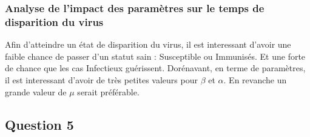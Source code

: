 \documentclass[a4paper, 11pt, oneside]{article}
\begin{document}
\subsubsection{Analyse de l'impact des paramètres sur le temps de disparition du virus}
Afin d'atteindre un état de disparition du virus, il est interessant d'avoir une faible chance de passer d'un 
statut sain : Susceptible ou Immunisés. Et une forte de chance que les cas Infectieux guérissent. 
Dorénavant, en terme de paramètres, il est interessant d'avoir de très petites valeurs pour 
$\beta$ et $\alpha$. En revanche un grande valeur de $\mu$ serait préférable.

\subsection{Question 5}
\end{document}
